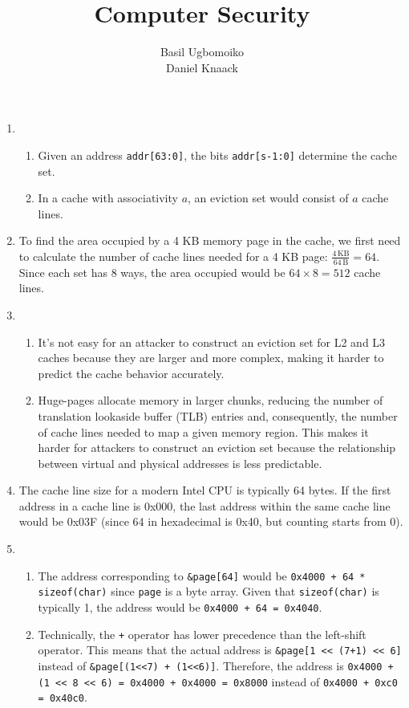 \documentclass[sheet=2, prefix, english]{dexercise}
\title{Computer Security}
\author{Basil Ugbomoiko\\Daniel Knaack}
\begin{document}
\task[Caches]

\begin{enumerate}
  \item
    \begin{enumerate}
      \item
        Given an address \texttt{addr[63:0]}, the bits \texttt{addr[s-1:0]}
        determine the cache set.
      \item
        In a cache with associativity $a$, an eviction set would consist of $a$
        cache lines.
    \end{enumerate}
  \item
    To find the area occupied by a 4 KB memory page in the cache, we first need
    to calculate the number of cache lines needed for a 4 KB page: $\frac{4\,
    \text{KB}}{64\, \text{B}} = 64$.
    Since each set has 8 ways, the area occupied would be $64 \times 8 = 512$
    cache lines.
  \item
    \begin{enumerate}
      \item
        It's not easy for an attacker to construct an eviction set for L2 and
        L3 caches because they are larger and more complex, making it harder to
        predict the cache behavior accurately.
      \item
        Huge-pages allocate memory in larger chunks, reducing the number of
        translation lookaside buffer (TLB) entries and, consequently, the
        number of cache lines needed to map a given memory region.
        This makes it harder for attackers to construct an eviction set because
        the relationship between virtual and physical addresses is less
        predictable.
    \end{enumerate}
  \item
    The cache line size for a modern Intel CPU is typically 64 bytes.
    If the first address in a cache line is 0x000, the last address within the
    same cache line would be 0x03F (since 64 in hexadecimal is 0x40, but
    counting starts from 0).
  \item
    \begin{enumerate}
      \item
        The address corresponding to \texttt{\&page[64]} would be
        \texttt{0x4000 + 64 * sizeof(char)} since \texttt{page} is a byte
        array. Given that \texttt{sizeof(char)} is typically 1, the address
        would be \texttt{0x4000 + 64 = 0x4040}.
      \item
        Technically, the \texttt{+} operator has lower precedence than the
        left-shift operator.
        This means that the actual address is \texttt{\&page[1~<<~(7+1)~<<~6]}
        instead of \texttt{\&page[(1<<7)~+~(1<<6)]}.
        Therefore, the address is \texttt{0x4000 + (1 << 8 << 6) = 0x4000 +
        0x4000 = 0x8000} instead of \texttt{0x4000 + 0xc0 = 0x40c0}.


\end{enumerate}
\end{enumerate}
\end{document}
